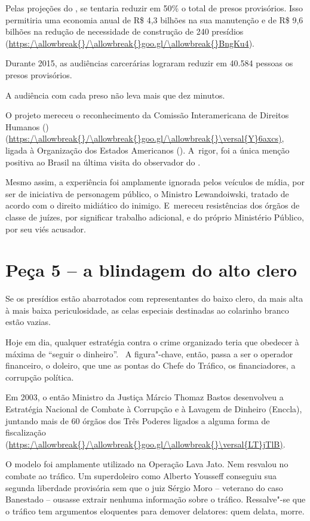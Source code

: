 Pelas projeções do , se tentaria reduzir em 50\% o total de presos
provisórios. Isso permitiria uma economia anual de R\$ 4,3 bilhões na
sua manutenção e de R\$ 9,6 bilhões na redução de necessidade de
construção de 240 presídios (\url{https:/\allowbreak{}/\allowbreak{}goo.gl/\allowbreak{}BngKu4}).

Durante 2015, as audiências carcerárias lograram reduzir em 40.584
pessoas os presos provisórios.

 

A audiência com cada preso não leva mais que dez minutos.

O projeto mereceu o reconhecimento da Comissão Interamericana de
Direitos Humanos () (\url{https:/\allowbreak{}/\allowbreak{}goo.gl/\allowbreak{}\versal{Y}6axcs)}, ligada à
Organização dos Estados Americanos (). A~rigor, foi a única menção
positiva ao Brasil na última visita do observador do .

Mesmo assim, a experiência foi amplamente ignorada pelos veículos de
mídia, por ser de iniciativa de personagem público, o Ministro
Lewandoiwski, tratado de acordo com o direito midiático do inimigo. E~mereceu resistências dos órgãos de classe de juízes, por significar
trabalho adicional, e do próprio Ministério Público, por seu viés
acusador.

\section{Peça 5 -- a blindagem do alto clero}

Se os presídios estão abarrotados com representantes do baixo clero, da
mais alta à mais baixa periculosidade, as celas especiais destinadas ao
colarinho branco estão vazias.

Hoje em dia, qualquer estratégia contra o crime organizado teria que
obedecer à máxima de ``seguir o dinheiro''. ~A figura"-chave, então,
passa a ser o operador financeiro, o doleiro, que une as pontas do Chefe
do Tráfico, os financiadores, a corrupção política.

 

Em 2003, o então Ministro da Justiça Márcio Thomaz Bastos desenvolveu a
Estratégia Nacional de Combate à Corrupção e à Lavagem de Dinheiro
(Enccla), juntando mais de 60 órgãos dos Três Poderes ligados a alguma
forma de fiscalização (\url{https:/\allowbreak{}/\allowbreak{}goo.gl/\allowbreak{}\versal{LT}jTlB)}.

O modelo foi amplamente utilizado na Operação Lava Jato. Nem resvalou no
combate ao tráfico. Um superdoleiro como Alberto Yousseff conseguiu sua
segunda liberdade provisória sem que o juiz Sérgio Moro -- veterano do
caso Banestado -- ousasse extrair nenhuma informação sobre o tráfico.
Ressalve"-se que o tráfico tem argumentos eloquentes para demover
delatores: quem delata, morre.

